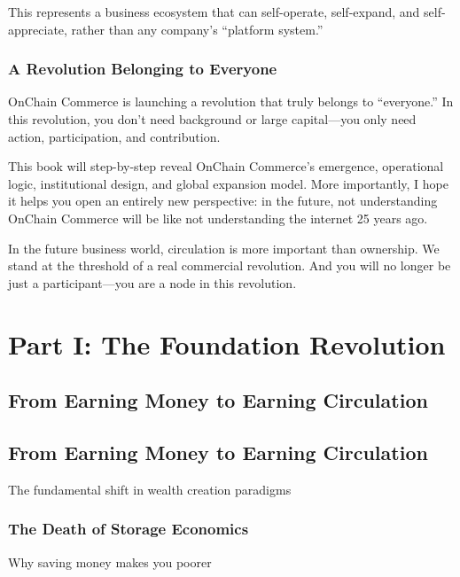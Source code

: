 \documentclass[
  Letterpaper,
]{scrbook}
\begin{document}
This represents a business ecosystem that can self-operate, self-expand,
and self-appreciate, rather than any company's ``platform system.''

\section{A Revolution Belonging to
Everyone}\label{a-revolution-belonging-to-everyone}

OnChain Commerce is launching a revolution that truly belongs to
``everyone.'' In this revolution, you don't need background or large
capital---you only need action, participation, and contribution.

This book will step-by-step reveal OnChain Commerce's emergence,
operational logic, institutional design, and global expansion model.
More importantly, I hope it helps you open an entirely new perspective:
in the future, not understanding OnChain Commerce will be like not
understanding the internet 25 years ago.

In the future business world, circulation is more important than
ownership. We stand at the threshold of a real commercial revolution.
And you will no longer be just a participant---you are a node in this
revolution.

\part{Part I: The Foundation Revolution}

\chapter{From Earning Money to Earning
Circulation}\label{from-earning-money-to-earning-circulation-1}

\chapter{From Earning Money to Earning
Circulation}\label{sec-earning-circulation}

The fundamental shift in wealth creation paradigms

\section{The Death of Storage
Economics}\label{the-death-of-storage-economics}

Why saving money makes you poorer
\end{document}
